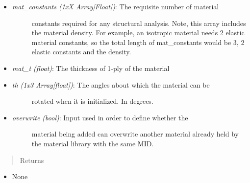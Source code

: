 \documentclass[letterpaper,10pt,english]{sphinxmanual}
\begin{document}
\begin{fulllineitems}
\begin{fulllineitems}
\begin{itemize}
\begin{description}
\end{description}

\item {} \begin{description}
\item[{\emph{mat\_constants (1xX Array{[}Float{]})}: The requisite number of material}] \leavevmode
constants required for any structural analysis. Note, this
array includes the material density. For example, an isotropic
material needs 2 elastic material constants, so the total
length of mat\_constants would be 3, 2 elastic constants and the
density.

\end{description}

\item {} 
\emph{mat\_t (float)}: The thickness of 1-ply of the material

\item {} \begin{description}
\item[{\emph{th (1x3 Array{[}float{]})}: The angles about which the material can be}] \leavevmode
rotated when it is initialized. In degrees.

\end{description}

\item {} \begin{description}
\item[{\emph{overwrite (bool)}: Input used in order to define whether the}] \leavevmode
material being added can overwrite another material already
held by the material library with the same MID.

\end{description}

\end{itemize}
\begin{quote}\begin{description}
\item[{Returns}] \leavevmode
\end{description}\end{quote}
\begin{itemize}
\item {} 
None

\end{itemize}

\end{fulllineitems}



\end{fulllineitems}
\end{document}
